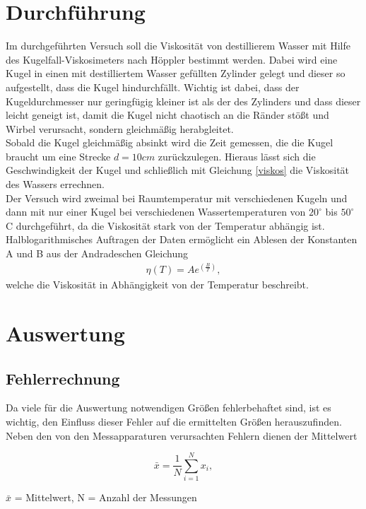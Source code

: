 	\section{Durchführung}
Im durchgeführten Versuch soll die Viskosität von destillierem Wasser mit Hilfe des Kugelfall-Viskosimeters nach Höppler bestimmt werden. Dabei wird eine Kugel in einen mit destilliertem Wasser gefüllten Zylinder gelegt und dieser so aufgestellt, dass die Kugel hindurchfällt. Wichtig ist dabei, dass der Kugeldurchmesser nur geringfügig kleiner ist als der des Zylinders und dass dieser leicht geneigt ist, damit die Kugel nicht chaotisch an die Ränder stößt und Wirbel verursacht, sondern gleichmäßig herabgleitet.\\
Sobald die Kugel gleichmäßig absinkt wird die Zeit gemessen, die die Kugel braucht um eine Strecke $d = 10cm$ zurückzulegen. Hieraus lässt sich die Geschwindigkeit der Kugel und schließlich mit Gleichung \eqref{viskos} die Viskosität des Wassers errechnen.\\
Der Versuch wird zweimal bei Raumtemperatur mit verschiedenen Kugeln und dann mit nur einer Kugel bei verschiedenen Wassertemperaturen von $20 ^\circ $ bis $50 ^\circ $ C durchgeführt, da die Viskosität stark von der Temperatur abhängig ist. Halblogarithmisches Auftragen der Daten ermöglicht ein Ablesen der Konstanten A und B aus der Andradeschen Gleichung
\begin{align}
	\eta(T)=Ae^{\left(\frac{B}{T}\right)},
	\label{andrade}
\end{align}
welche die Viskosität in Abhängigkeit von der Temperatur beschreibt.

\section{Auswertung}
\subsection{Fehlerrechnung}
Da viele für die Auswertung notwendigen Größen fehlerbehaftet sind, ist es wichtig, den Einfluss dieser Fehler auf die ermittelten
Größen herauszufinden. Neben den von den Messapparaturen verursachten Fehlern dienen der Mittelwert
\newpage
\begin{formel}
\begin{equation}
 \bar{x} = \frac1N \sum_{i=1}^{N} x_i,
\end{equation}
\caption*{\small{$\bar{x}$ = Mittelwert, N = Anzahl der Messungen}}
\end{formel}

